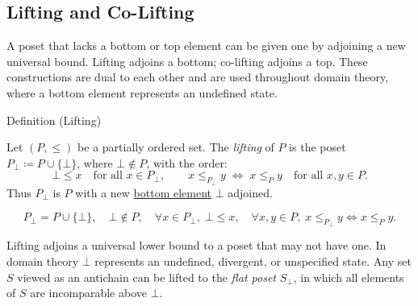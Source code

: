 
\subsection{Lifting and Co-Lifting}
\label{sec:lifting}

\begin{remark*}
A poset that lacks a bottom or top element can be given one by adjoining
a new universal bound.  Lifting adjoins a bottom; co-lifting adjoins a
top.  These constructions are dual to each other and are used throughout
domain theory, where a bottom element represents an undefined state.
\end{remark*}


\begin{definitionbox}{Definition (Lifting)}
\begin{definition}[Lifting]
\label{def:lifting}
Let $(P, \leq)$ be a partially ordered set.  The \emph{lifting} of $P$
is the poset $P_{\bot} \coloneqq P \cup \{\bot\}$, where $\bot \notin P$,
with the order:
\[
\bot \leq x \quad \text{for all } x \in P_{\bot},
\qquad
x \leq_{P_{\bot}} y \;\Longleftrightarrow\; x \leq_P y
\quad \text{for all } x, y \in P.
\]
Thus $P_{\bot}$ is $P$ with a new
\hyperref[def:bottom-element]{bottom element} $\bot$ adjoined.
\end{definition}
\end{definitionbox}

\begin{remark*}
\[
P_{\bot} = P \cup \{\bot\},\quad
\bot \notin P,\quad
\forall x \in P_{\bot},\; \bot \leq x,\quad
\forall x,y \in P,\; x \leq_{P_\bot} y \Leftrightarrow x \leq_P y.
\]
\end{remark*}

\begin{remark*}[Interpretation]
Lifting adjoins a universal lower bound to a poset that may not have one.
In domain theory $\bot$ represents an undefined, divergent, or
unspecified state.  Any set $S$ viewed as an antichain can be lifted to
the \emph{flat poset} $S_{\bot}$, in which all elements of $S$ are
incomparable above $\bot$.
\end{remark*}

